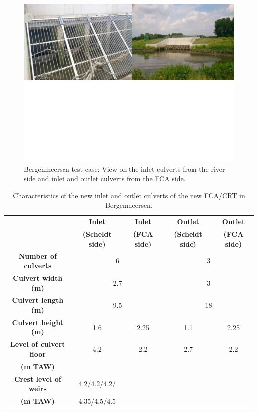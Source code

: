 \begin{figure}[H]
\begin{center}
  \includegraphics[scale=0.5, trim = 0 300 0 0, clip]{img/figure3.png}
\end{center}
\caption{Bergenmeersen test case: View on the inlet culverts from the river side and inlet and outlet culverts from the FCA side.}
\label{fig:bergenmeersen_figure3}
\end{figure}

\begin{table}[H]
\caption{Characteristics of the new inlet and outlet culverts of the new
FCA/CRT in Bergenmeersen.}\label{tab:bergenmeersen_table1}
\begin{center}\begin{tabular}{|c|c|c|c|c|}
\hline
~ & \textbf{Inlet} & \textbf{Inlet} & \textbf{Outlet} & \textbf{Outlet}\\
~ & \textbf{(Scheldt side)} & \textbf{(FCA side)} & \textbf{(Scheldt side)} & \textbf{(FCA side)}\\
\hline
\textbf{Number of culverts} & \multicolumn{2}{c|}{6} & \multicolumn{2}{c|}{3} \\
\hline
\textbf{Culvert width (m)} & \multicolumn{2}{c|}{2.7} & \multicolumn{2}{c|}{3} \\
\hline
\textbf{Culvert length (m)} & \multicolumn{2}{c|}{9.5} & \multicolumn{2}{c|}{18} \\
\hline
\textbf{Culvert height (m)} & 1.6 & 2.25 & 1.1 & 2.25\\
\hline
\textbf{Level of culvert floor} & 4.2 & 2.2 & 2.7 & 2.2\\
\textbf{(m TAW)} & ~ & ~ & ~ & ~\\
\hline
\textbf{Crest level of weirs} & 4.2/4.2/4.2/ & ~ & ~ & ~ \\
\textbf{(m TAW)} & 4.35/4.5/4.5 & ~ & ~ & ~ \\
\hline
\end{tabular}\end{center}
\end{table}
%
